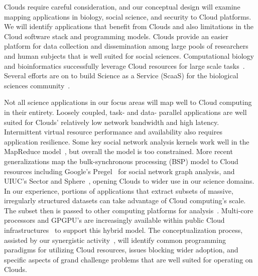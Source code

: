 Clouds require careful consideration, and our conceptual design will examine mapping applications
in biology, social science, and security to Cloud platforms. 
We will identify applications
that benefit from Clouds and also limitations in the Cloud software stack and programming models.
Clouds provide an easier platform for data collection and dissemination among large
pools of researchers and human subjects that is well suited for social sciences.
Computational biology and bioinformatics successfully leverage Cloud resources for
large scale tasks~\cite{langmead:Cloudsnp:2009, lu:azureblast:2010}.
Several efforts are on to build Science as a Service (ScaaS) for the biological
sciences community~\cite{carmen,myexperiment,Afgan2011}.

Not all science applications in our focus areas will map well to Cloud computing in their entirety.
Loosely coupled, task- and data- parallel applications are well suited for Clouds' relatively low
network bandwidth and high latency. 
Intermittent virtual resource performance and availability
also requires application resilience. 
Some key social network analysis kernels work well in the
MapReduce model~\cite{conf/icdm/KangTF09}, but overall the model is too constrained. 
More recent generalizations map
the bulk-synchronous processing (BSP) model to Cloud resources including Google's Pregel~\cite{conf/spaa/MalewiczABDHLC09}
for social network graph analysis, and UIUC's Sector and Sphere~\cite{conf/spaa/MalewiczABDHLC09,oai:arXiv.org:0808.3019}, 
opening Clouds to wider use in our science domains. 
In our experience, portions of applications that extract subsets of
massive, irregularly structured datasets can take advantage of Cloud computing's scale. 
The subset
then is passed to other computing platforms for analysis~\cite{Cloud.hybrid}. Multi-core processors and GPGPU's are
increasingly available within public Cloud
infrastructures~\cite{AmazonGPU} to support this hybrid model.
The conceptualization process, assisted by our synergistic activity~\cite{prasanna:cic:pillcrow}, will identify common
programming paradigms for utilizing Cloud resources, issues blocking wider adoption, and specific
aspects of grand challenge problems that are well suited for operating on Clouds.

